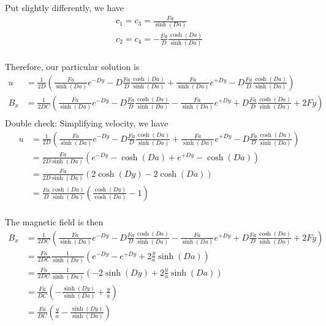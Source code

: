 \documentclass[11pt]{article}
\begin{document}
Put slightly differently, we have
\begin{equation}\begin{aligned}
c_1  = c_3 =  \frac{Fa}{\sinh(Da)} \\
c_2  = c_4 = -\frac{Fa}{D} \frac{\cosh(Da)}{\sinh(Da)} \\
\end{aligned} \end{equation}

Therefore, our particular solution is
\small
\begin{equation}\begin{aligned}
u   & = \frac{1}{2D}  \left(\frac{Fa}{\sinh(Da)} e^{-D y} - D \frac{Fa}{D} \frac{\cosh(Da)}{\sinh(Da)} + \frac{Fa}{\sinh(Da)} e^{+D y} - D \frac{Fa}{D} \frac{\cosh(Da)}{\sinh(Da)} \right) \\
B_x & = \frac{1}{2DC} \left(\frac{Fa}{\sinh(Da)} e^{-D y} - D \frac{Fa}{D} \frac{\cosh(Da)}{\sinh(Da)} - \frac{Fa}{\sinh(Da)} e^{+D y} + D \frac{Fa}{D} \frac{\cosh(Da)}{\sinh(Da)} + 2F y \right) \\
\end{aligned} \end{equation}
Double check:
\normalsize
Simplifying velocity, we have
\begin{equation}\begin{aligned}
u   & = \frac{1}{2D}  \left(\frac{Fa}{\sinh(Da)} e^{-D y} - D \frac{Fa}{D} \frac{\cosh(Da)}{\sinh(Da)} + \frac{Fa}{\sinh(Da)} e^{+D y} - D \frac{Fa}{D} \frac{\cosh(Da)}{\sinh(Da)} \right) \\
    & = \frac{Fa}{2D \sinh(Da)}  \left(e^{-D y} - \cosh(Da) + e^{+D y} - \cosh(Da) \right) \\
    & = \frac{Fa}{2D \sinh(Da)}  \left(2 \cosh(Dy) - 2 \cosh(Da) \right) \\
    & = \frac{Fa}{D} \frac{\cosh(Da)}{\sinh(Da)}  \left( \frac{\cosh(Dy)}{\cosh(Da)}  - 1 \right) \\
\end{aligned} \end{equation}

The magnetic field is then
\begin{equation}\begin{aligned}
B_x & = \frac{1}{2DC} \left(\frac{Fa}{\sinh(Da)} e^{-D y} - D \frac{Fa}{D} \frac{\cosh(Da)}{\sinh(Da)} - \frac{Fa}{\sinh(Da)} e^{+D y} + D \frac{Fa}{D} \frac{\cosh(Da)}{\sinh(Da)} + 2F y \right) \\
    & = \frac{Fa}{2DC} \frac{1}{\sinh(Da)} \left(e^{-D y} - e^{+D y} + 2 \frac{y}{a} \sinh(Da) \right) \\
    & = \frac{Fa}{2DC} \frac{1}{\sinh(Da)} \left(-2\sinh(Dy) + 2 \frac{y}{a} \sinh(Da) \right) \\
    & = \frac{Fa}{DC} \left(-\frac{\sinh(Dy)}{\sinh(Da)} + \frac{y}{a} \right) \\
    & = \frac{Fa}{DC} \left(\frac{y}{a} - \frac{\sinh(Dy)}{\sinh(Da)}\right) \\
\end{aligned} \end{equation}
\end{document}
